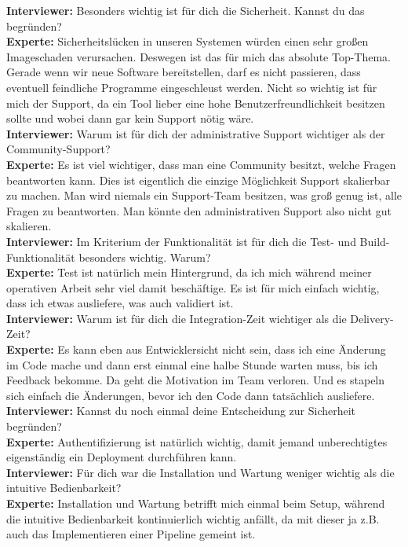 \begin{center}
\begin{figure}[H]
    \centering
    \label{fig:gew_33}
\end{figure}	
\end{center}
\newpage
\resetlinenumber
\begin{linenumbers}
    \textbf{Interviewer:} Besonders wichtig ist für dich die Sicherheit. Kannst du das begründen?\\
    \textbf{Experte:} Sicherheitslücken in unseren Systemen würden einen sehr großen Imageschaden verursachen. Deswegen ist das für mich das absolute Top-Thema. Gerade wenn wir neue Software bereitstellen, darf es nicht passieren, dass eventuell feindliche Programme eingeschleust werden. Nicht so wichtig ist für mich der Support, da ein Tool lieber eine hohe Benutzerfreundlichkeit besitzen sollte und wobei dann gar kein Support nötig wäre.\\
    \textbf{Interviewer:} Warum ist für dich der administrative Support wichtiger als der Community-Support?\\
    \textbf{Experte:} Es ist viel wichtiger, dass man eine Community besitzt, welche Fragen beantworten kann. Dies ist eigentlich die einzige Möglichkeit Support skalierbar zu machen. Man wird niemals ein Support-Team besitzen, was groß genug ist, alle Fragen zu beantworten. Man könnte den administrativen Support also nicht gut skalieren.\\
    \textbf{Interviewer:} Im Kriterium der Funktionalität ist für dich die Test- und Build-Funktionalität besonders wichtig. Warum?\\
    \textbf{Experte:} Test ist natürlich mein Hintergrund, da ich mich während meiner operativen Arbeit sehr viel damit beschäftige. Es ist für mich einfach wichtig, dass ich etwas ausliefere, was auch validiert ist.\\
    \textbf{Interviewer:} Warum ist für dich die Integration-Zeit wichtiger als die Delivery-Zeit?\\
    \textbf{Experte:} Es kann eben aus Entwicklersicht nicht sein, dass ich eine Änderung im Code mache und dann erst einmal eine halbe Stunde warten muss, bis ich Feedback bekomme. Da geht die Motivation im Team verloren. Und es stapeln sich einfach die Änderungen, bevor ich den Code dann tatsächlich ausliefere.\\
    \textbf{Interviewer:} Kannst du noch einmal deine Entscheidung zur Sicherheit begründen?\\
    \textbf{Experte:} Authentifizierung ist natürlich wichtig, damit jemand unberechtigtes eigenständig ein Deployment durchführen kann.\\
    \textbf{Interviewer:} Für dich war die Installation und Wartung weniger wichtig als die intuitive Bedienbarkeit?\\
    \textbf{Experte:} Installation und Wartung betrifft mich einmal beim Setup, während die intuitive Bedienbarkeit kontinuierlich wichtig anfällt, da mit dieser ja z.B. auch das Implementieren einer Pipeline gemeint ist.\\
\end{linenumbers}



